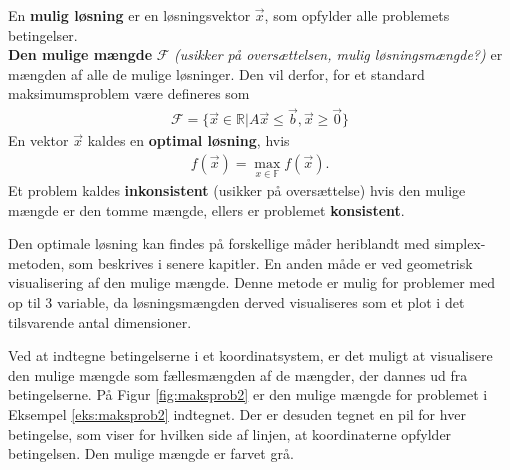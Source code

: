 \begin{defn}
En \textbf{mulig løsning} er en løsningsvektor $\vec{x}$, som opfylder alle problemets betingelser.\\
\textbf{Den mulige mængde} $\mathcal{F}$ \textit{(usikker på oversættelsen, mulig løsningsmængde?)} er mængden af alle de mulige løsninger. Den vil derfor, for et standard maksimumsproblem være defineres som
\begin{align*}
\mathcal{F}=\{\vec{x} \in \mathds{R}|A\vec{x} \leq \vec{b}, \vec{x} \geq \vec{0}\}
\end{align*}
En vektor $\vec{x}$ kaldes en \textbf{optimal løsning}, hvis 
\begin{align}
	f(\vec{x})=\max\limits_{x \in \mathds{F}}f(\vec{x}).
\end{align}
Et problem kaldes \textbf{inkonsistent} (usikker på oversættelse) hvis den mulige mængde er den tomme mængde, ellers er problemet \textbf{konsistent}. %
\end{defn}

Den optimale løsning kan findes på forskellige måder heriblandt med simplex-metoden, som beskrives i senere kapitler. En anden måde er ved geometrisk visualisering af den mulige mængde. Denne metode er mulig for problemer med op til 3 variable, da løsningsmængden derved visualiseres som et plot i det tilsvarende antal dimensioner. 

\begin{eks}
Ved at indtegne betingelserne i et koordinatsystem, er det muligt at visualisere den mulige mængde som fællesmængden af de mængder, der dannes ud fra betingelserne. På Figur \ref{fig:maksprob2} er den mulige mængde for problemet i Eksempel \ref{eks:maksprob2} indtegnet. Der er desuden tegnet en pil for hver betingelse, som viser for hvilken side af linjen, at koordinaterne opfylder betingelsen. Den mulige mængde er farvet grå.

\begin{center}
	
	\label{fig:maksprob2}
\end{center}

\end{eks}

